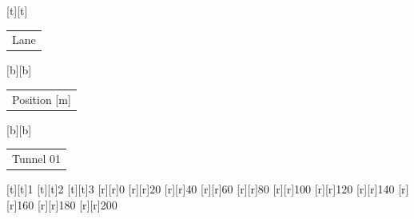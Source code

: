 %    
%
%
\begin{psfrags}%
\psfragscanon%
%
[t][t]{\color[rgb]{0,0,0}\setlength{\tabcolsep}{0pt}\begin{tabular}{c}Lane\end{tabular}}%
[b][b]{\color[rgb]{0,0,0}\setlength{\tabcolsep}{0pt}\begin{tabular}{c}Position [m]\end{tabular}}%
[b][b]{\color[rgb]{0,0,0}\setlength{\tabcolsep}{0pt}\begin{tabular}{c}Tunnel 01\end{tabular}}%
%
[t][t]{1}%
[t][t]{2}%
[t][t]{3}%
%
[r][r]{0}%
[r][r]{20}%
[r][r]{40}%
[r][r]{60}%
[r][r]{80}%
[r][r]{100}%
[r][r]{120}%
[r][r]{140}%
[r][r]{160}%
[r][r]{180}%
[r][r]{200}%
%
%
\end{psfrags}%
%
